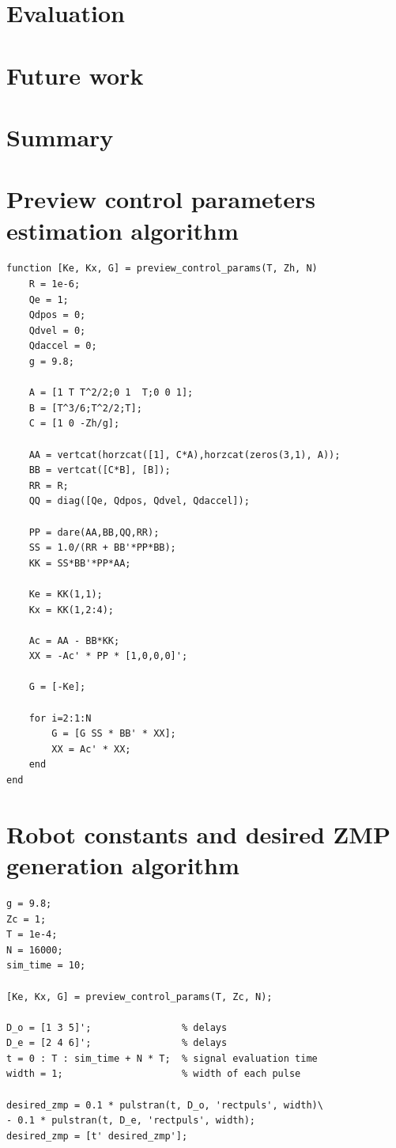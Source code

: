 \documentclass[12pt,a4paper]{report}
\begin{document}
	\chapter{Evaluation}
	\chapter{Future work}
	\chapter{Summary}
	
	
	
	
	\begin{appendices}
		\chapter{Preview control parameters estimation algorithm}
			\begin{lstlisting}
function [Ke, Kx, G] = preview_control_params(T, Zh, N)
	R = 1e-6;
	Qe = 1;
	Qdpos = 0;
	Qdvel = 0;
	Qdaccel = 0;
	g = 9.8;
	
	A = [1 T T^2/2;0 1  T;0 0 1];
	B = [T^3/6;T^2/2;T];
	C = [1 0 -Zh/g];
	
	AA = vertcat(horzcat([1], C*A),horzcat(zeros(3,1), A));
	BB = vertcat([C*B], [B]);
	RR = R;
	QQ = diag([Qe, Qdpos, Qdvel, Qdaccel]);
	
	PP = dare(AA,BB,QQ,RR);
	SS = 1.0/(RR + BB'*PP*BB);
	KK = SS*BB'*PP*AA;
	
	Ke = KK(1,1);
	Kx = KK(1,2:4);
	
	Ac = AA - BB*KK;
	XX = -Ac' * PP * [1,0,0,0]';
	
	G = [-Ke];
	
	for i=2:1:N
		G = [G SS * BB' * XX];
		XX = Ac' * XX;
	end
end
			\end{lstlisting}
		\chapter{Robot constants and desired ZMP generation algorithm}
			\begin{lstlisting}
g = 9.8;
Zc = 1;
T = 1e-4;
N = 16000;
sim_time = 10;

[Ke, Kx, G] = preview_control_params(T, Zc, N);

D_o = [1 3 5]';                % delays
D_e = [2 4 6]';                % delays
t = 0 : T : sim_time + N * T;  % signal evaluation time
width = 1;                     % width of each pulse

desired_zmp = 0.1 * pulstran(t, D_o, 'rectpuls', width)\
- 0.1 * pulstran(t, D_e, 'rectpuls', width);
desired_zmp = [t' desired_zmp'];
			\end{lstlisting}
	\end{appendices}
  
\end{document}
